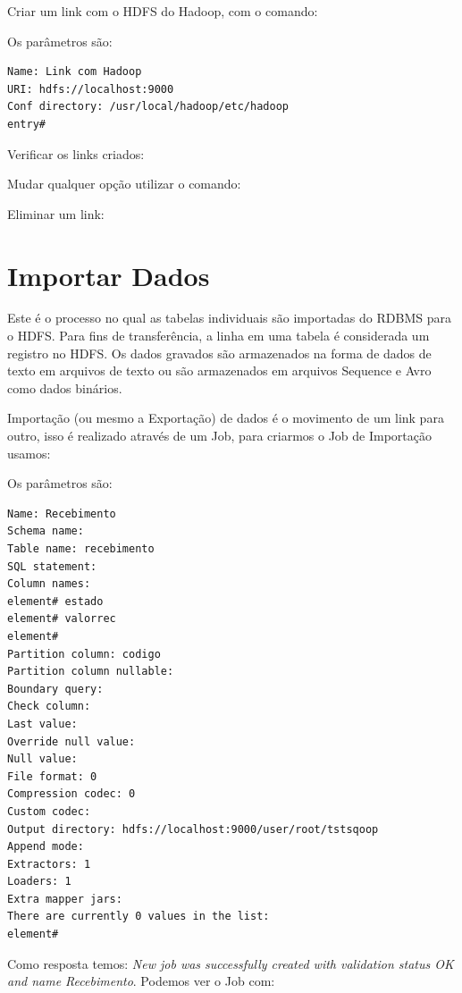 \documentclass[a4paper,11pt]{article}
\begin{document}
Criar um link com o HDFS do Hadoop, com o comando: \\

Os parâmetros são:
\begin{lstlisting}[]
Name: Link com Hadoop
URI: hdfs://localhost:9000
Conf directory: /usr/local/hadoop/etc/hadoop
entry#
\end{lstlisting}

Verificar os links criados: \\

Mudar qualquer opção utilizar o comando: \\

Eliminar um link:

\section{Importar Dados}
Este é o processo no qual as tabelas individuais são importadas do RDBMS para o HDFS. Para fins de transferência, a linha em uma tabela é considerada um registro no HDFS. Os dados gravados são armazenados na forma de dados de texto em arquivos de texto ou são armazenados em arquivos Sequence e Avro como dados binários.

Importação (ou mesmo a Exportação) de dados é o movimento de um link para outro, isso é realizado através de um Job, para criarmos o Job de Importação usamos: \\

Os parâmetros são:
\begin{lstlisting}[]
Name: Recebimento
Schema name:
Table name: recebimento
SQL statement:
Column names:
element# estado
element# valorrec
element#
Partition column: codigo
Partition column nullable:
Boundary query:
Check column:
Last value:
Override null value:
Null value:
File format: 0
Compression codec: 0
Custom codec:
Output directory: hdfs://localhost:9000/user/root/tstsqoop
Append mode:
Extractors: 1
Loaders: 1
Extra mapper jars:
There are currently 0 values in the list:
element#
\end{lstlisting}

Como resposta temos: \textit{New job was successfully created with validation status OK and name Recebimento}. Podemos ver o Job com: \\
\end{document}
